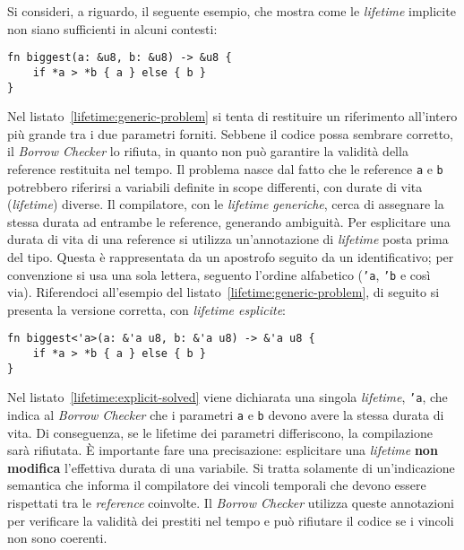 Si consideri, a riguardo, il seguente esempio, che mostra come le \textit{lifetime} implicite non siano sufficienti in alcuni contesti:
\begin{lstlisting}[style=ruststyle, caption={Limitazione delle \textit{lifetime} generiche}, label={lifetime:generic-problem}]
fn biggest(a: &u8, b: &u8) -> &u8 {
    if *a > *b { a } else { b }
}
\end{lstlisting}
Nel listato~\ref{lifetime:generic-problem} si tenta di restituire un riferimento all'intero più grande tra i due parametri forniti. Sebbene il codice possa sembrare corretto, il \textit{Borrow Checker} lo rifiuta, in quanto non può garantire la validità della reference restituita nel tempo.
Il problema nasce dal fatto che le reference \texttt{a} e \texttt{b} potrebbero riferirsi a variabili definite in scope differenti, con durate di vita (\textit{lifetime}) diverse.
Il compilatore, con le \textit{lifetime generiche}, cerca di assegnare la stessa durata ad entrambe le reference, generando ambiguità. \hfill \break \break
\noindent Per esplicitare una durata di vita di una reference si utilizza un'annotazione di \textit{lifetime} posta prima del tipo. Questa è rappresentata da un apostrofo seguito da un identificativo; per convenzione si usa una sola lettera, seguento l'ordine alfabetico (\texttt{'a}, \texttt{'b} e così via).
Riferendoci all'esempio del listato~\ref{lifetime:generic-problem}, di seguito si presenta la versione corretta, con \textit{lifetime esplicite}:
\begin{lstlisting}[style=ruststyle, caption={\textit{Lifetime} esplicite}, label={lifetime:explicit-solved}]
fn biggest<'a>(a: &'a u8, b: &'a u8) -> &'a u8 {
    if *a > *b { a } else { b }
}
\end{lstlisting}
Nel listato~\ref{lifetime:explicit-solved} viene dichiarata una singola \textit{lifetime}, \texttt{'a}, che indica al \textit{Borrow Checker} che i parametri \texttt{a} e \texttt{b} devono avere la stessa durata di vita. Di conseguenza, se le lifetime dei parametri differiscono, la compilazione sarà rifiutata. \hfill \break \break
\noindent È importante fare una precisazione: esplicitare una \textit{lifetime} \textbf{non modifica} l'effettiva durata di una variabile. Si tratta solamente di un'indicazione semantica che informa il compilatore dei vincoli temporali che devono essere rispettati tra le \textit{reference} coinvolte. Il \textit{Borrow Checker} utilizza queste annotazioni per verificare la validità dei prestiti nel tempo e può rifiutare il codice se i vincoli non sono coerenti.

